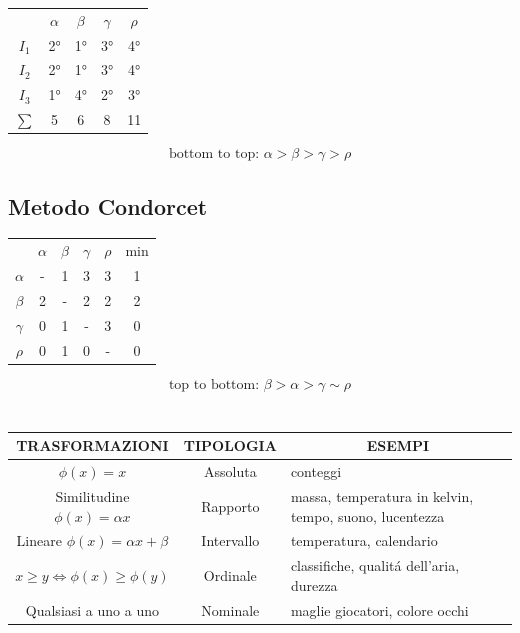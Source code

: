 \documentclass[fontsize=8pt]{scrartcl}
\newcommand{\mysection}[1]{
    \setlength\fboxsep{4pt} %
    \section*{\colorbox{black}{\makebox[\linewidth][l]{\color{white}#1\hfill}}}
}
\begin{document}
\begin{multicols*}{2}
\begin{center}
    \begin{tabular}{c c c c c}
                    & \(\alpha\)  & \(\beta\) & \(\gamma\)& \(\rho\)\\
            \(I_1\) & 2°  & 1° & 3° & 4°\\
            \(I_2\) & 2° & 1° & 3° & 4°\\
            \(I_3\) & 1° & 4° & 2° & 3°\\\hline
            \(\sum\)& 5 & 6 & 8 & 11
    \end{tabular}
    \begin{equation*}
        \text{bottom to top: } \alpha > \beta > \gamma > \rho
    \end{equation*}
\end{center}

\subsection*{Metodo Condorcet}

\begin{center}
    \begin{tabular}{c c c c c|c}
                    & \(\alpha\)  & \(\beta\) & \(\gamma\)& \(\rho\) & min\\
            \(\alpha\)  & - & 1 & 3 & 3 & 1\\
            \(\beta\)   & 2 & - & 2 & 2 & 2\\
            \(\gamma\)  & 0 & 1 & - & 3 & 0\\
            \(\rho\)    & 0 & 1 & 0 & - & 0\\
    \end{tabular}
    \begin{equation*}
        \text{top to bottom: } \beta > \alpha > \gamma \sim \rho
    \end{equation*}
\end{center}

\mysection{SCALE}
\begin{center}
    \begin{tabularx}{\linewidth}{|c|c|X|}
        \hline
       TRASFORMAZIONI & TIPOLOGIA & \multicolumn{1}{c|}{ESEMPI} \\\hline
       \(\phi (x)=x\) & Assoluta & conteggi\\\hline
       \makecell{Similitudine \\ \(\phi (x)=\alpha x\)} & Rapporto & massa, temperatura in kelvin, tempo, suono, lucentezza\\\hline
       \makecell{Lineare \\ \(\phi (x)=\alpha x + \beta\)} & Intervallo & temperatura, calendario\\\hline
       \(x \geq y \Leftrightarrow \phi(x)\geq\phi(y)\) & Ordinale & classifiche, qualitá dell'aria, durezza\\\hline
       Qualsiasi a uno a uno & Nominale & maglie giocatori, colore occhi\\\hline
    \end{tabularx}
\end{center}


\end{multicols*}
\end{document}
